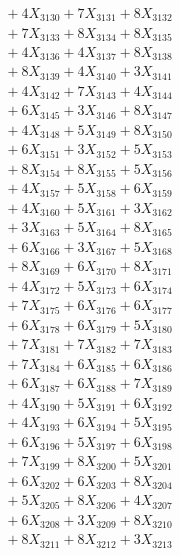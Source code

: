 \documentclass[a4paper,10pt]{article}
\begin{document}
{\begin{align}
&\;  + 4 X_{3130} + 7 X_{3131} + 8 X_{3132} \\[0.3ex]
&\;  + 7 X_{3133} + 8 X_{3134} + 8 X_{3135} \\[0.3ex]
&\;  + 4 X_{3136} + 4 X_{3137} + 8 X_{3138} \\[0.3ex]
&\;  + 8 X_{3139} + 4 X_{3140} + 3 X_{3141} \\[0.3ex]
&\;  + 4 X_{3142} + 7 X_{3143} + 4 X_{3144} \\[0.3ex]
&\;  + 6 X_{3145} + 3 X_{3146} + 8 X_{3147} \\[0.3ex]
&\;  + 4 X_{3148} + 5 X_{3149} + 8 X_{3150} \\[0.3ex]
&\;  + 6 X_{3151} + 3 X_{3152} + 5 X_{3153} \\[0.3ex]
&\;  + 8 X_{3154} + 8 X_{3155} + 5 X_{3156} \\[0.3ex]
&\;  + 4 X_{3157} + 5 X_{3158} + 6 X_{3159} \\[0.5ex]\allowbreak
&\;  + 4 X_{3160} + 5 X_{3161} + 3 X_{3162} \\[0.3ex]
&\;  + 3 X_{3163} + 5 X_{3164} + 8 X_{3165} \\[0.3ex]
&\;  + 6 X_{3166} + 3 X_{3167} + 5 X_{3168} \\[0.3ex]
&\;  + 8 X_{3169} + 6 X_{3170} + 8 X_{3171} \\[0.3ex]
&\;  + 4 X_{3172} + 5 X_{3173} + 6 X_{3174} \\[0.3ex]
&\;  + 7 X_{3175} + 6 X_{3176} + 6 X_{3177} \\[0.3ex]
&\;  + 6 X_{3178} + 6 X_{3179} + 5 X_{3180} \\[0.3ex]
&\;  + 7 X_{3181} + 7 X_{3182} + 7 X_{3183} \\[0.3ex]
&\;  + 7 X_{3184} + 6 X_{3185} + 6 X_{3186} \\[0.3ex]
&\;  + 6 X_{3187} + 6 X_{3188} + 7 X_{3189} \\[0.5ex]\allowbreak
&\;  + 4 X_{3190} + 5 X_{3191} + 6 X_{3192} \\[0.3ex]
&\;  + 4 X_{3193} + 6 X_{3194} + 5 X_{3195} \\[0.3ex]
&\;  + 6 X_{3196} + 5 X_{3197} + 6 X_{3198} \\[0.3ex]
&\;  + 7 X_{3199} + 8 X_{3200} + 5 X_{3201} \\[0.3ex]
&\;  + 6 X_{3202} + 6 X_{3203} + 8 X_{3204} \\[0.3ex]
&\;  + 5 X_{3205} + 8 X_{3206} + 4 X_{3207} \\[0.3ex]
&\;  + 6 X_{3208} + 3 X_{3209} + 8 X_{3210} \\[0.3ex]
&\;  + 8 X_{3211} + 8 X_{3212} + 3 X_{3213} \\[0.3ex]

\end{align}}
\end{document}
